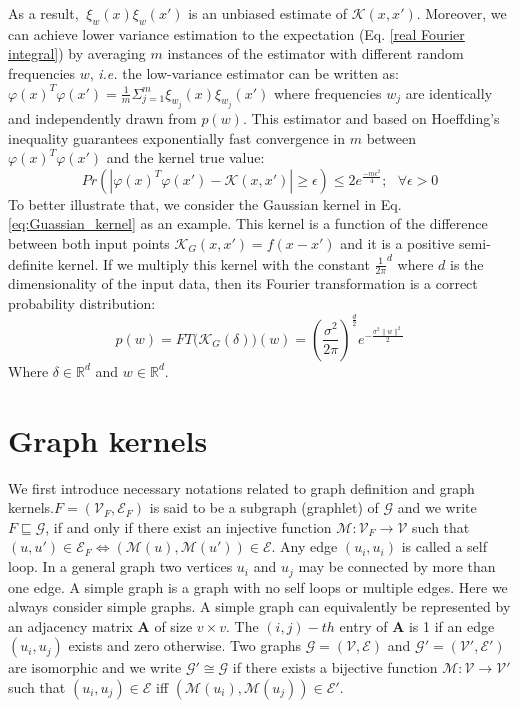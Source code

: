 As a result, $\ \xi_w(x)\xi_w(x')$ is an unbiased estimate of $\mathcal{K}(x,x')$. Moreover, we can achieve lower variance estimation to the expectation (Eq. \ref{real Fourier integral}) by averaging $m$ instances of the estimator with different random frequencies $w$, \emph{i.e.} the low-variance estimator can be written as: $\varphi(x)^T\varphi(x')=\frac{1}{m} \Sigma_{j=1}^m \xi_{w_j}(x)\xi_{w_j}(x')$ where frequencies $w_j$ are identically and independently drawn from $p(w)$. This estimator and based on Hoeffding's inequality guarantees exponentially fast convergence in $m$ between $\varphi(x)^T\varphi(x')$ and the kernel true value:
\begin{equation}
    Pr(|\varphi(x)^T\varphi(x')-\mathcal{K}(x,x')|\geq\epsilon)\leq2e^\frac{-m\epsilon^2}{4};~~~ \forall \epsilon >0
\end{equation}
To better illustrate that, we consider the Gaussian kernel in Eq. \ref{eq:Guassian_kernel} as an example. This kernel is a function of the difference between both input points $\mathcal{K}_G(x,x')=f(x-x')$ and it is a positive semi-definite kernel. If we multiply this kernel with the constant $\frac{1}{2\pi}^d$ where $d$ is the dimensionality of the input data, then its Fourier transformation is a correct probability distribution:
\[p(w)=FT\big(\mathcal{K}_G(\delta)\big)(w)=(\frac{\sigma^2}{2\pi})^\frac{d}{2}e^{-\frac{\sigma^2\|w\|^2}{2}}\]
Where $\delta\in\mathbb{R}^d$ and $w\in\mathbb{R}^d$.

\section{Graph kernels}
 We first introduce  necessary notations related to graph definition and graph kernels.\newline $F=(\mathcal{V}_F,\mathcal{E}_F)$ is said to be a subgraph (graphlet) of $\mathcal{G}$ and we write $F\sqsubseteq \mathcal{G}$, if and only if there exist an injective function $\mathcal{M}:\mathcal{V}_F\xrightarrow{} \mathcal{V}$ such that $(u,u')\in \mathcal{E}_F \Leftrightarrow{(\mathcal{M}(u),\mathcal{M}(u'))\in \mathcal{E}}$.\newline
Any edge $(u_i, u_i)$ is called a self loop. In a general graph two vertices $u_i$ and $u_j$ may be connected by more than
one edge. A simple graph is a graph with no self loops
or multiple edges. Here we always consider simple graphs.\newline
A simple graph can equivalently be represented by an adjacency matrix $\mathbf{A}$ of size $v \times v$. The $(i,j)-th$ entry of $\mathbf{A}$ is 1 if an edge $(u_i, u_j)$ exists and zero otherwise.\newline
Two graphs $\mathcal{G}=(\mathcal{V},\mathcal{E})$ and $\mathcal{G'}=(\mathcal{V'},\mathcal{E'})$ are isomorphic and we write $\mathcal{G}'\cong \mathcal{G}$ if there exists a bijective function $\mathcal{M}:\mathcal{V}\xrightarrow{} \mathcal{V}'$ such that $(u_i,u_j)\in \mathcal{E}$ iff $(\mathcal{M}(u_i),\mathcal{M}(u_j))\in \mathcal{E}'$.

